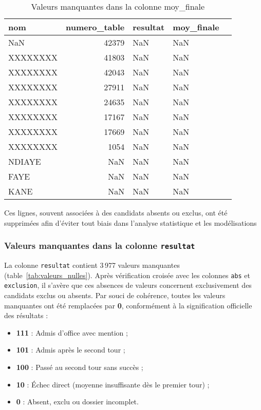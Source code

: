 \begin{table}[ht]
\centering
\caption{Valeurs manquantes dans la colonne moy\_finale}
\label{tab:null_moyenne}
\begin{tabular}{lrllr}
\toprule
nom & numero\_table & resultat & moy\_finale \\
\midrule
NaN & 42379 & NaN & NaN \\
XXXXXXXX & 41803 & NaN & NaN \\
XXXXXXXX & 42043 & NaN & NaN \\
XXXXXXXX & 27911 & NaN & NaN \\
XXXXXXXX & 24635 & NaN & NaN \\
XXXXXXXX & 17167 & NaN & NaN \\
XXXXXXXX & 17669 & NaN & NaN \\
XXXXXXXX & 1054 & NaN & NaN \\
NDIAYE & NaN & NaN & NaN \\
FAYE & NaN & NaN & NaN \\
KANE & NaN & NaN & NaN \\
\bottomrule
\end{tabular}
\end{table}

Ces lignes, souvent associées à des candidats absents ou exclus, ont été supprimées afin d’éviter tout biais dans l’analyse statistique et les modélisations

\subsubsection{Valeurs manquantes dans la colonne \texttt{resultat}}

La colonne \texttt{resultat} contient 3\,977 valeurs manquantes (table~\ref{tab:valeurs_nulles}). 
Après vérification croisée avec les colonnes \texttt{abs} et \texttt{exclusion}, il s’avère que ces absences de valeurs concernent exclusivement des candidats exclus ou absents. 
Par souci de cohérence, toutes les valeurs manquantes ont été remplacées par \textbf{0}, conformément à la signification officielle des résultats :

\begin{itemize}
    \item \textbf{111} : Admis d’office avec mention ;
    \item \textbf{101} : Admis après le second tour ;
    \item \textbf{100} : Passé au second tour sans succès ;
    \item \textbf{10} : Échec direct (moyenne insuffisante dès le premier tour) ;
    \item \textbf{0} : Absent, exclu ou dossier incomplet.
\end{itemize}

